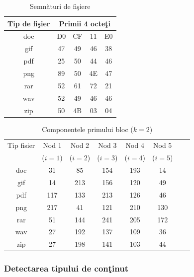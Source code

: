 \documentclass{llncs}
\begin{document}
\begin{table}
\bigskip
\begin{center}
\caption{Semn\u{a}turi de fi\c{s}iere}\label{tb:margins}
\label{table:sign}
\begin{tabular}{ccccc}
Tip de fi\c{s}ier &  \multicolumn{4}{c}{Primii 4 octe\c{t}i}\\ \hline 
doc &  D0 & CF & 11 & E0\\
gif & 47 & 49 & 46 & 38 \\
pdf & 25 & 50 & 44 & 46 \\
png & 89 & 50 & 4E & 47 \\
rar & 52 & 61 & 72 & 21 \\
wav & 52 & 49 & 46 & 46 \\
zip & 50 & 4B & 03 & 04\\  \hline
\end{tabular}
\end{center}
\bigskip
\end{table}

\begin{table}
\begin{center}
\caption{Componentele primului bloc ($k=2$)}\label{tb:margins}
\label{table:shares}
\begin{tabular}{cccccccc}
Tip fisier & Nod 1 & Nod 2 & Nod 3 & Nod 4 & Nod 5 \\
  & ($i=1$) & ($i=2$) & ($i=3$) & ($i=4$) & ($i=5$) \\
\hline
doc & 31 & 85 & 154 & 193 & 14 \\
gif & 14 & 213 & 156 & 120 & 49 \\
pdf & 117 & 133 & 213 & 126 & 46 \\
png & 217 & 41 & 121 & 210 & 130 \\ 
rar & 51 & 144 & 241 & 205 & 172  \\
wav & 27 & 192 & 137 & 109 & 36 \\
zip & 27 & 198 & 141 & 103 & 44 \\ \hline
\end{tabular}
\end{center}
\bigskip
\end{table}


\subsubsection{Detectarea tipului de con\c{t}inut}\hspace*{\fill} \\
\label{subsec:file_content_detection}
\end{document}
